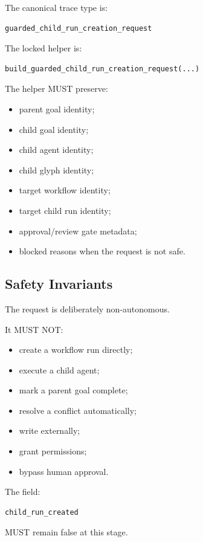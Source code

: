 The canonical trace type is:

\begin{verbatim}
guarded_child_run_creation_request
\end{verbatim}

The locked helper is:

\begin{verbatim}
build_guarded_child_run_creation_request(...)
\end{verbatim}

The helper MUST preserve:

\begin{itemize}
  \item parent goal identity;
  \item child goal identity;
  \item child agent identity;
  \item child glyph identity;
  \item target workflow identity;
  \item target child run identity;
  \item approval/review gate metadata;
  \item blocked reasons when the request is not safe.
\end{itemize}

\subsection{Safety Invariants}

The request is deliberately non-autonomous.

It MUST NOT:

\begin{itemize}
  \item create a workflow run directly;
  \item execute a child agent;
  \item mark a parent goal complete;
  \item resolve a conflict automatically;
  \item write externally;
  \item grant permissions;
  \item bypass human approval.
\end{itemize}

The field:

\begin{verbatim}
child_run_created
\end{verbatim}

MUST remain false at this stage.

